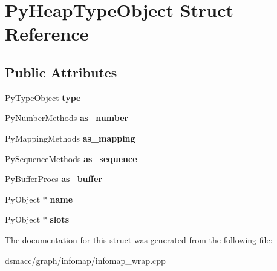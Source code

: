 \hypertarget{structPyHeapTypeObject}{}\section{Py\+Heap\+Type\+Object Struct Reference}
\label{structPyHeapTypeObject}
\subsection*{Public Attributes}
\begin{DoxyCompactItemize}
\item 
\mbox{\label{structPyHeapTypeObject_a8b961137de4ebeed5a5d2e4b47ee1ca7}} 
Py\+Type\+Object {\bfseries type}
\item 
\mbox{\label{structPyHeapTypeObject_a795de378df40d11321c0dbe463759560}} 
Py\+Number\+Methods {\bfseries as\+\_\+number}
\item 
\mbox{\label{structPyHeapTypeObject_a3112d193aea288a92036360bec1ce0a5}} 
Py\+Mapping\+Methods {\bfseries as\+\_\+mapping}
\item 
\mbox{\label{structPyHeapTypeObject_ad553caad5da3a7004aae1b7ac0289f12}} 
Py\+Sequence\+Methods {\bfseries as\+\_\+sequence}
\item 
\mbox{\label{structPyHeapTypeObject_a026c64b0a5163ea580e79640ecf209de}} 
Py\+Buffer\+Procs {\bfseries as\+\_\+buffer}
\item 
\mbox{\label{structPyHeapTypeObject_a5440c0413b3c519d996119695c957c80}} 
Py\+Object $\ast$ {\bfseries name}
\item 
\mbox{\label{structPyHeapTypeObject_a15212a8f85d939b3f4b133ecda1b62e5}} 
Py\+Object $\ast$ {\bfseries slots}
\end{DoxyCompactItemize}


The documentation for this struct was generated from the following file\+:\begin{DoxyCompactItemize}
\item 
dsmacc/graph/infomap/infomap\+\_\+wrap.\+cpp\end{DoxyCompactItemize}
